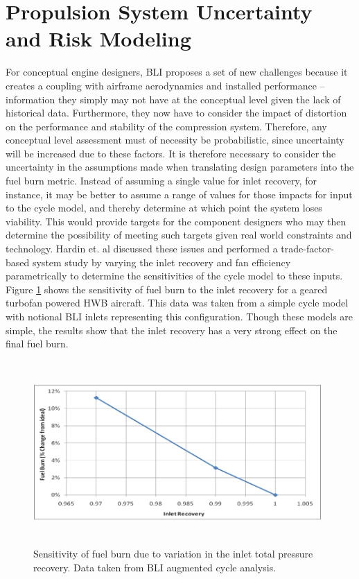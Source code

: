 \documentclass[12pt]{gatech-thesis}
\begin{document}
\section{Propulsion System Uncertainty and Risk Modeling}
\indent For conceptual engine designers, BLI proposes a set of new challenges because it creates a coupling with airframe aerodynamics and installed performance -- information they simply may not have at the conceptual level given the lack of historical data.  Furthermore, they now have to consider the impact of distortion on the performance and stability of the compression system.  Therefore, any conceptual level assessment must of necessity be probabilistic, since uncertainty will be increased due to these factors.  It is therefore necessary to consider the uncertainty in the assumptions made when translating design parameters into the fuel burn metric.  Instead of assuming a single value for inlet recovery, for instance, it may be better to assume a range of values for those impacts for input to the cycle model, and thereby determine at which point the system loses viability.  This would provide targets for the component designers who may then determine the possibility of meeting such targets given real world constraints and technology.  Hardin et. al discussed these issues and performed a trade-factor-based system study by varying the inlet recovery and fan efficiency parametrically to determine the sensitivities of the cycle model to these inputs.  Figure \ref{Inlet_Sensitivity} shows the sensitivity of fuel burn to the inlet recovery for a geared turbofan powered HWB aircraft.  This data was taken from a simple cycle model with notional BLI inlets representing this configuration.  Though these models are simple, the results show that the inlet recovery has a very strong effect on the final fuel burn.  
	\begin{figure}[htpb]
	\centering
	\includegraphics[width=110mm, height =70mm, clip=true, trim = 1mm 1mm 1mm 1mm]{Inlet_Sensitivity.png}
	\caption{Sensitivity of fuel burn due to variation in the inlet total pressure recovery.  Data taken from BLI augmented cycle analysis.}
	\label{Inlet_Sensitivity}
	\end{figure}
\end{document}
